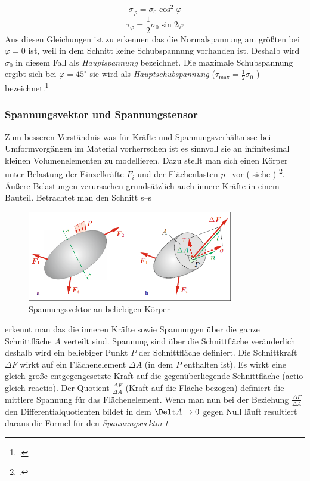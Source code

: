\documentclass[12pt,a4paper,parskip]{scrartcl}
\begin{document}
{\begin{equation}
\sigma_{\varphi} = \sigma_0\cos^2{\varphi}
\end{equation}
\begin{equation}
\tau_{\varphi} = \frac{1}{2} \sigma_0\sin{2\varphi}
\end{equation}
Aus diesen Gleichungen ist zu erkennen das die Normalspannung am größten bei $ \varphi = 0 $ ist, weil in dem Schnitt keine Schubspannung vorhanden ist. Deshalb wird $ \sigma_0 $ in diesem Fall als \emph{Hauptspannung} bezeichnet. Die maximale Schubspannung ergibt sich bei $ \varphi = 45^{\circ} $ sie wird als \emph{Hauptschubspannung} ($ \tau_{\text{max}} = \frac{1}{2}\sigma_0 $ ) bezeichnet.\footcite[Vgl.][388]{dd}



  
\subsubsection{Spannungsvektor und Spannungstensor}
Zum besseren Verständnis was für Kräfte und Spannungsverhältnisse bei Umformvorgängen im Material vorherrschen ist es sinnvoll sie an infinitesimal kleinen Volumenelementen zu modellieren. Dazu stellt man sich einen Körper unter Belastung der Einzelkräfte $ F_i $ und der Flächenlasten $ p $ \ vor ( siehe ) \footcite [Vgl.][43]{tmr}. Äußere Belastungen verursachen grundsätzlich auch innere Kräfte in einem Bauteil. Betrachtet man den Schnitt s--s \begin{figure}
  \centering
  \includegraphics[width=0.8\textwidth]{normalvektor}
  \caption{Spannungsvektor an beliebigen Körper}
  \label{fig:normalvektor}
  \end{figure} erkennt man das die inneren Kräfte sowie Spannungen über die ganze Schnittfläche $ A $ verteilt sind. Spannung sind über die Schnittfläche veränderlich deshalb  wird ein beliebiger Punkt $ P $ der Schnittfläche definiert. Die Schnittkraft $ \Delta F $  wirkt auf ein Flächenelement $ \Delta A $ (in dem $ P $ enthalten ist). Es wirkt eine gleich große entgegengesetzte Kraft auf die gegenüberliegende Schnittfläche (actio gleich reactio). Der Quotient $ \frac{\Delta F}{\Delta A} $ (Kraft auf die Fläche bezogen) definiert die mittlere Spannung für das Flächenelement. Wenn man nun bei der Beziehung $ \frac{\Delta F}{\Delta A} $ den Differentialquotienten bildet in dem $ \Delt A \rightarrow 0 $ gegen Null läuft  resultiert daraus die Formel für den \emph{Spannungsvektor }$ t $ \begin{equation}

\end{equation}}
\end{document}
